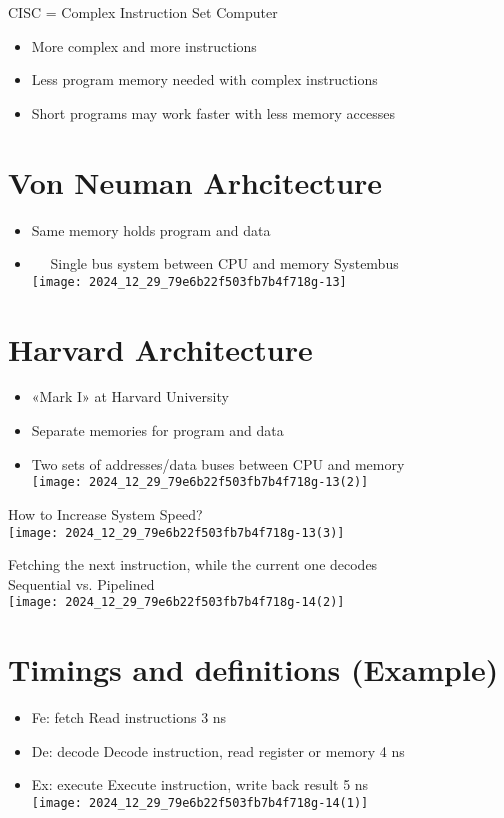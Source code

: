     CISC = Complex Instruction Set Computer
    
    \begin{itemize}
      \item More complex and more instructions
      \item Less program memory needed with complex instructions
      \item Short programs may work faster with less memory accesses
    \end{itemize}
    
    \section*{Von Neuman Arhcitecture}
    \begin{itemize}
      \item Same memory holds program and data
      \item $\quad$ Single bus system between CPU and memory Systembus\\
    \texttt{[image: 2024\_12\_29\_79e6b22f503fb7b4f718g-13]}
    \end{itemize}
    
    \section*{Harvard Architecture}
    \begin{itemize}
      \item «Mark I» at Harvard University
      \item Separate memories for program and data
      \item Two sets of addresses/data buses between CPU and memory\\
    \texttt{[image: 2024\_12\_29\_79e6b22f503fb7b4f718g-13(2)]}
    \end{itemize}
    
    How to Increase System Speed?\\
    \texttt{[image: 2024\_12\_29\_79e6b22f503fb7b4f718g-13(3)]}
    
    Fetching the next instruction, while the current one decodes\\
    Sequential vs. Pipelined\\
    \texttt{[image: 2024\_12\_29\_79e6b22f503fb7b4f718g-14(2)]}
    
    \section*{Timings and definitions (Example)}
    \begin{itemize}
      \item Fe: fetch Read instructions 3 ns
      \item De: decode Decode instruction, read register or memory 4 ns
      \item Ex: execute Execute instruction, write back result 5 ns\\
    \texttt{[image: 2024\_12\_29\_79e6b22f503fb7b4f718g-14(1)]}
    \end{itemize}
    
